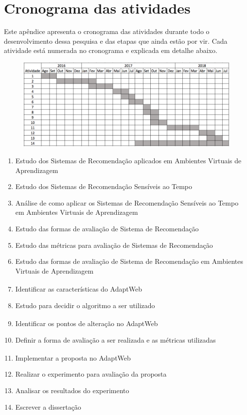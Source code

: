 \chapter{Cronograma das atividades}\label{cha:cronograma}

Este apêndice apresenta o cronograma das atividades durante todo o desenvolvimento dessa pesquisa e das etapas que ainda
estão por vir. Cada atividade está numerada no cronograma e explicada em detalhe abaixo.

\begin{figure}[htb]
  \begin{center}
      \includegraphics[scale=0.5]{./Figuras/cronograma.png}
  \end{center}
\end{figure}

\begin{enumerate}
\item Estudo dos Sistemas de Recomendação aplicados em Ambientes Virtuais de Aprendizagem
\item Estudo dos Sistemas de Recomendação Sensíveis ao Tempo
\item Análise de como aplicar os Sistemas de Recomendação Sensíveis ao Tempo em Ambientes Virtuais de Aprendizagem
\item Estudo das formas de avaliação de Sistema de Recomendação
\item Estudo das métricas para avaliação de Sistemas de Recomendação
\item Estudo das formas de avaliação de Sistema de Recomendação em Ambientes Virtuais de Aprendizagem
\item Identificar as características do AdaptWeb\textsuperscript{\textregistered}
\item Estudo para decidir o algoritmo a ser utilizado
\item Identificar os pontos de alteração no AdaptWeb\textsuperscript{\textregistered}
\item Definir a forma de avaliação a ser realizada e as métricas utilizadas
\item Implementar a proposta no AdaptWeb\textsuperscript{\textregistered}
\item Realizar o experimento para avaliação da proposta
\item Analisar os resultados do experimento
\item Escrever a dissertação
\end{enumerate}
